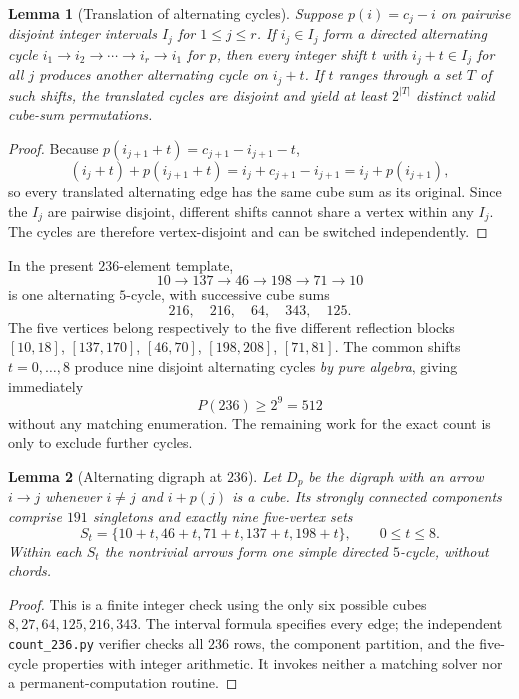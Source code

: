 \documentclass[10pt]{article}
\newtheorem{lemma}{Lemma}
\begin{document}
\begin{lemma}[Translation of alternating cycles]
\label{lem:transport}
Suppose $p(i)=c_j-i$ on pairwise disjoint
integer intervals $I_j$ for $1\le j\le r$.
If $i_j\in I_j$ form a directed alternating
cycle $i_1\to i_2\to\cdots\to i_r\to i_1$
for $p$, then every integer shift $t$
with $i_j+t\in I_j$ for all $j$ produces
another alternating cycle on $i_j+t$.
If $t$ ranges through a set $T$ of such
shifts, the translated cycles are disjoint
and yield at least $2^{|T|}$ distinct valid
cube-sum permutations.
\end{lemma}
\begin{proof}
Because $p(i_{j+1}+t)=c_{j+1}-i_{j+1}-t$,
\[
(i_j+t)+p(i_{j+1}+t)
=i_j+c_{j+1}-i_{j+1}
=i_j+p(i_{j+1}),
\]
so every translated alternating edge has
the same cube sum as its original.
Since the $I_j$ are pairwise disjoint,
different shifts cannot share a vertex
within any $I_j$. The cycles are
therefore vertex-disjoint and can be
switched independently.
\end{proof}

In the present $236$-element template,
\[
10\to137\to46\to198\to71\to10
\]
is one alternating $5$-cycle, with
successive cube sums
\[
216,\quad216,\quad64,\quad343,\quad125.
\]
The five vertices belong respectively to
the five different reflection blocks
$[10,18]$, $[137,170]$, $[46,70]$,
$[198,208]$, $[71,81]$.
The common shifts $t=0,\dots,8$
produce nine disjoint alternating cycles
\emph{by pure algebra}, giving immediately
\[
\boxed{P(236)\ge2^9=512}
\]
without any matching enumeration.
The remaining work for the exact count
is only to exclude further cycles.

\begin{lemma}[Alternating digraph at $236$]\label{lem:236}
Let $D_p$ be the digraph with an arrow $i\to j$
whenever $i\ne j$ and $i+p(j)$ is a cube.
Its strongly connected components comprise
$191$ singletons and exactly nine five-vertex sets
\[
S_t=\{10+t,46+t,71+t,137+t,198+t\},
\qquad 0\le t\le8.
\]
Within each $S_t$ the nontrivial arrows form
one simple directed $5$-cycle, without chords.
\end{lemma}
\begin{proof}
This is a finite integer check using the only six
possible cubes $8,27,64,125,216,343$.
The interval formula specifies every edge; the
independent \texttt{count\_236.py} verifier checks
all $236$ rows, the component partition, and
the five-cycle properties with integer arithmetic.
It invokes neither a matching solver nor
a permanent-computation routine.
\end{proof}
\end{document}
